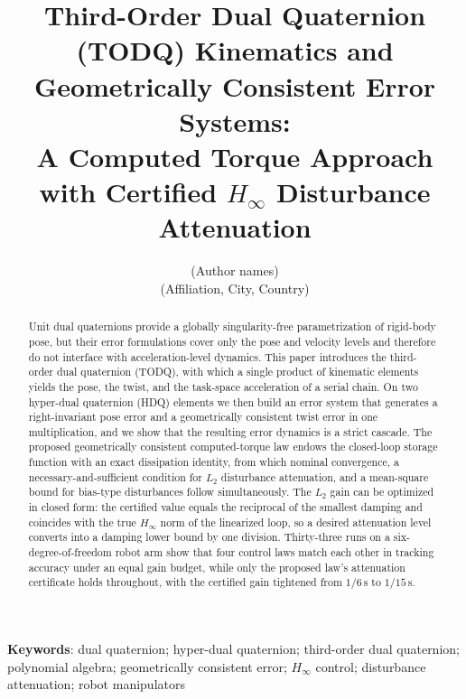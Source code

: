 \documentclass[11pt,a4paper]{article}
\title{Third-Order Dual Quaternion (TODQ) Kinematics and Geometrically
       Consistent Error Systems:\\
       A Computed Torque Approach with Certified $H_\infty$ Disturbance Attenuation}
\author{(Author names)\\(Affiliation, City, Country)}
\date{}
\theoremstyle{tndqplain}
\theoremstyle{tndqremark}
\begin{document}
\maketitle
\thispagestyle{fancy}

\begin{abstract}
\noindent
Unit dual quaternions provide a globally singularity-free parametrization of rigid-body pose, but their error formulations cover only the pose and velocity levels and therefore do not interface with acceleration-level dynamics. This paper introduces the third-order dual quaternion (TODQ), with which a single product of kinematic elements yields the pose, the twist, and the task-space acceleration of a serial chain. On two hyper-dual quaternion (HDQ) elements we then build an error system that generates a right-invariant pose error and a geometrically consistent twist error in one multiplication, and we show that the resulting error dynamics is a strict cascade. The proposed geometrically consistent computed-torque law endows the closed-loop storage function with an exact dissipation identity, from which nominal convergence, a necessary-and-sufficient condition for $L_2$ disturbance attenuation, and a mean-square bound for bias-type disturbances follow simultaneously. The $L_2$ gain can be optimized in closed form: the certified value equals the reciprocal of the smallest damping and coincides with the true $H_\infty$ norm of the linearized loop, so a desired attenuation level converts into a damping lower bound by one division. Thirty-three runs on a six-degree-of-freedom robot arm show that four control laws match each other in tracking accuracy under an equal gain budget, while only the proposed law's attenuation certificate holds throughout, with the certified gain tightened from $1/6\,\mathrm{s}$ to $1/15\,\mathrm{s}$.
\end{abstract}

\medskip
\noindent\textbf{Keywords}: dual quaternion; hyper-dual quaternion; third-order dual quaternion; polynomial algebra; geometrically consistent error; $H_\infty$ control; disturbance attenuation; robot manipulators

\bigskip








\end{document}
